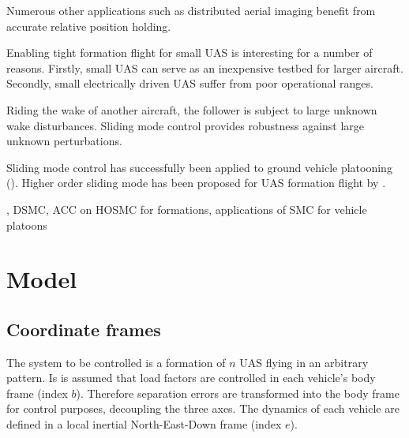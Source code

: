 \documentclass{ifacconf}
\begin{document}
Numerous other applications such as distributed aerial imaging benefit from accurate relative position holding.

Enabling tight formation flight for small UAS is interesting for a number of reasons. Firstly, small UAS can serve as an inexpensive testbed for larger aircraft. Secondly, small electrically driven UAS suffer from poor operational ranges.

Riding the wake of another aircraft, the follower is subject to large unknown wake disturbances. Sliding mode control provides robustness against large unknown perturbations.

Sliding mode control has successfully been applied to ground vehicle platooning (\cite{???}). Higher order sliding mode has been proposed for UAS formation flight by \cite{galzi2006uav}.

, DSMC, ACC on HOSMC for formations, applications of SMC for vehicle platoons

\section{Model}

\subsection{Coordinate frames}
The system to be controlled is a formation of $n$ UAS flying in an arbitrary pattern. Is is assumed that
load factors are controlled in each vehicle's body frame (index $b$). Therefore separation errors are transformed into the body frame for control purposes, decoupling the three axes. The dynamics of each vehicle are defined in a local inertial North-East-Down frame (index $e$).

\end{document}
